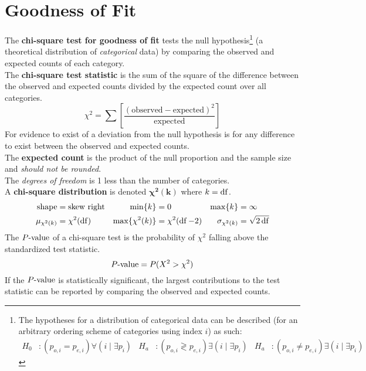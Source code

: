 \documentclass[../AP_Statistics.tex]{subfiles}
\begin{document}
		\section{Goodness of Fit}
			The \textbf{chi-square test for goodness of fit} tests the null hypothesis\footnote{The hypotheses for a distribution of categorical data can be described (for an arbitrary ordering scheme of categories using index $i$) as such:\begin{align*}H_0&:(p_{o, i} = p_{e, i})\forall(i \mid \exists p_i) & H_a&:(p_{o, i} \gtrless p_{e, i})\exists(i \mid \exists p_i) & H_a &:(p_{o, i} \ne p_{e, i})\exists(i \mid \exists p_i) \end{align*}} (a theoretical distribution of \emph{categorical} data) by comparing the observed and expected counts of each category. \\
			The \textbf{chi-square test statistic} is the sum of the square of the difference between the observed and expected counts divided by the expected count over all categories.
			\[\chi^2 = \sum\left[\mathrm{\frac{(observed - expected)^2}{expected}}\right]\]
			For evidence to exist of a deviation from the null hypothesis is for any difference to exist between the observed and expected counts. \\
			The \textbf{expected count} is the product of the null proportion and the sample size and \emph{should not be rounded}. \\
			The \emph{degrees of freedom} is 1 less than the number of categories. \\
			A \textbf{chi-square distribution} is denoted $\bm{\chi^2(k)}$ where $k = \operatorname{\mathrm{df}}$.
			\begin{align*}
				\text{shape} &= \text{skew right} & \min\{k\} &= 0 & \max\{k\} &= \infty \\
				\mu_{\chi^2(k)} &= \chi^2(\operatorname{\mathrm{df}}) & \max\{\chi^2(k)\} &= \chi^2(\operatorname{\mathrm{df}} - 2) & \sigma_{\chi^2(k)} &= \sqrt{2\operatorname{\mathrm{df}}}
			\end{align*}
			The $P\text{-value}$ of a chi-square test is the probability of $\chi^2$ falling above the standardized test statistic.
			\[P\text{-value} = P(X^2 > \chi^2)\]
			If the $P\text{-value}$ is statistically significant, the largest contributions to the test statistic can be reported by comparing the observed and expected counts. 
\end{document}
